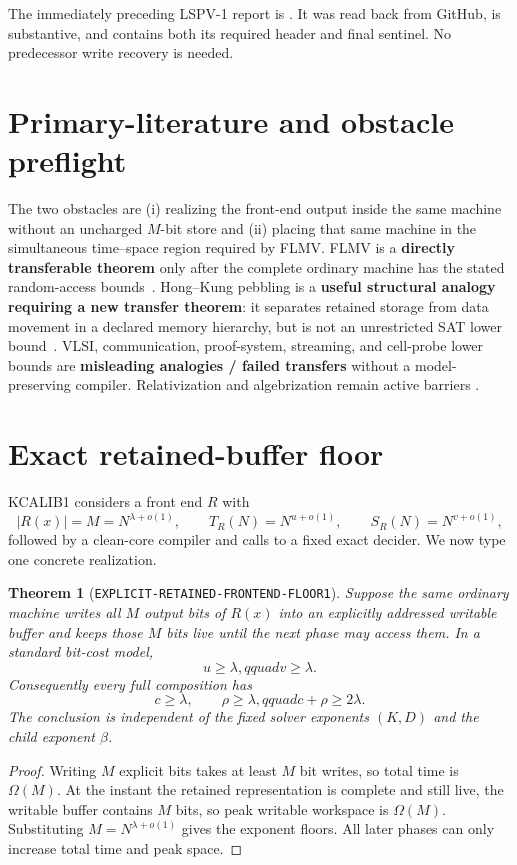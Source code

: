 \documentclass[11pt]{article}
\newtheorem{theorem}{Theorem}
\begin{document}
The immediately preceding LSPV-1 report is
.  It was read
back from GitHub, is substantive, and contains both its required header and
final sentinel.  No predecessor write recovery is needed.

\section{Primary-literature and obstacle preflight}
The two obstacles are (i) realizing the front-end output inside the same
machine without an uncharged $M$-bit store and (ii) placing that same machine
in the simultaneous time--space region required by FLMV.  FLMV is a
\textbf{directly transferable theorem} only after the complete ordinary
machine has the stated random-access bounds~\cite{FLMV05}.  Hong--Kung
pebbling is a \textbf{useful structural analogy requiring a new transfer
theorem}: it separates retained storage from data movement in a declared
memory hierarchy, but is not an unrestricted SAT lower bound~\cite{HK81}.
VLSI, communication, proof-system, streaming, and cell-probe lower bounds are
\textbf{misleading analogies / failed transfers} without a model-preserving
compiler.  Relativization and algebrization remain active barriers
\cite{BGS75,AW09}.

\section{Exact retained-buffer floor}
KCALIB1 considers a front end $R$ with
\[
 |R(x)|=M=N^{\lambda+o(1)},\qquad
 T_R(N)=N^{u+o(1)},\qquad S_R(N)=N^{v+o(1)},
\]
followed by a clean-core compiler and calls to a fixed exact decider.  We now
type one concrete realization.

\begin{theorem}[\texttt{EXPLICIT-RETAINED-FRONTEND-FLOOR1}]
Suppose the same ordinary machine writes all $M$ output bits of $R(x)$ into
an explicitly addressed writable buffer and keeps those $M$ bits live until
the next phase may access them.  In a standard bit-cost model,
\[
 u\ge\lambda,qquad v\ge\lambda.
\]
Consequently every full composition has
\[
 c\ge\lambda,\qquad \rho\ge\lambda,qquad c+\rho\ge2\lambda. \tag{1}
\]
The conclusion is independent of the fixed solver exponents $(K,D)$ and the
child exponent $\beta$.
\end{theorem}
\begin{proof}
Writing $M$ explicit bits takes at least $M$ bit writes, so total time is
$\Omega(M)$.  At the instant the retained representation is complete and
still live, the writable buffer contains $M$ bits, so peak writable workspace
is $\Omega(M)$.  Substituting $M=N^{\lambda+o(1)}$ gives the exponent floors.
All later phases can only increase total time and peak space.
\end{proof}
\end{document}

